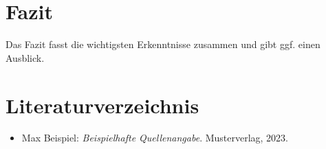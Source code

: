 \documentclass[12pt,a4paper]{article}
\begin{document}
\section{Fazit}
Das Fazit fasst die wichtigsten Erkenntnisse zusammen und gibt ggf. einen Ausblick.

\newpage
\section*{Literaturverzeichnis}
\begin{itemize}
    \item Max Beispiel: \textit{Beispielhafte Quellenangabe}. Musterverlag, 2023.
\end{itemize}
\end{document}
